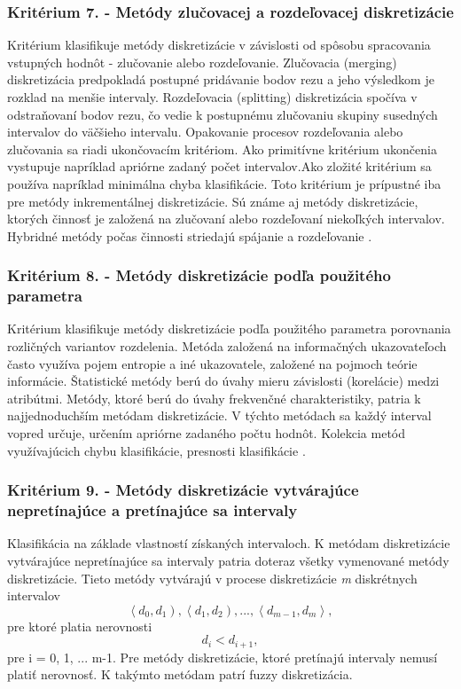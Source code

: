 \subsubsection*{Kritérium 7. - Metódy zlučovacej a rozdeľovacej diskretizácie}
Kritérium klasifikuje metódy diskretizácie v závislosti od spôsobu spracovania vstupných hodnôt - zlučovanie alebo rozdeľovanie.  Zlučovacia (merging) diskretizácia predpokladá postupné pridávanie bodov rezu a jeho výsledkom je rozklad na menšie intervaly. Rozdeľovacia (splitting) diskretizácia spočíva v odstraňovaní bodov rezu, čo vedie k postupnému zlučovaniu skupiny susedných intervalov do väčšieho intervalu. Opakovanie procesov rozdeľovania alebo zlučovania sa riadi ukončovacím kritériom. Ako primitívne kritérium ukončenia vystupuje napríklad apriórne zadaný počet intervalov.Ako zložité kritérium sa používa napríklad minimálna chyba klasifikácie. Toto kritérium je prípustné iba pre metódy inkrementálnej diskretizácie. Sú známe aj metódy diskretizácie, ktorých činnosť je založená na zlučovaní alebo rozdeľovaní niekoľkých intervalov. Hybridné metódy počas činnosti striedajú spájanie a rozdeľovanie \cite{levashenkoProj}.

\subsubsection*{Kritérium 8. - Metódy diskretizácie podľa použitého parametra }
Kritérium klasifikuje metódy diskretizácie podľa použitého parametra porovnania rozličných variantov rozdelenia.  Metóda založená na informačných ukazovateľoch často využíva pojem entropie a iné ukazovatele, založené na pojmoch teórie informácie. Štatistické metódy berú do úvahy mieru závislosti (korelácie) medzi atribútmi. Metódy, ktoré berú do úvahy frekvenčné charakteristiky, patria k najjednoduchším metódam diskretizácie. V týchto metódach sa každý interval vopred určuje, určením apriórne zadaného počtu hodnôt. Kolekcia metód využívajúcich chybu klasifikácie, presnosti klasifikácie \cite{levashenkoProj}.

\subsubsection*{Kritérium 9. - Metódy diskretizácie vytvárajúce nepretínajúce a pretínajúce sa intervaly}
Klasifikácia na základe vlastností získaných intervaloch. K metódam diskretizácie vytvárajúce nepretínajúce sa intervaly patria doteraz všetky vymenované metódy diskretizácie. 
Tieto metódy vytvárajú v procese diskretizácie \textit{m} diskrétnych intervalov
$$
\left\langle d_0, d_1 \right) , 
\left\langle d_1, d_2 \right) , ... , 
\left\langle d_{m-1}, d_m \right\rangle ,
$$ 
pre ktoré platia nerovnosti $$d_i < d_{i+1},$$ pre i = 0, 1, ... m-1.  Pre metódy diskretizácie, ktoré pretínajú intervaly nemusí platiť nerovnosť. K takýmto metódam patrí fuzzy diskretizácia\cite{levashenkoProj}. 

